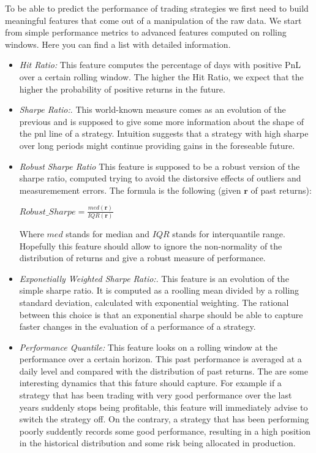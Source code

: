 \documentclass[a4paper]{article}
\numberwithin{equation}{subsection}
\begin{document}
To be able to predict the performance of trading strategies we first need to build meaningful features that come out of a manipulation of the raw data. We start from simple performance metrics to advanced features computed on rolling windows. Here you can find a list with detailed information.

\begin{itemize} 
	\item \textit{Hit Ratio:} This feature computes the percentage of days with positive PnL over a certain rolling window. The higher the Hit Ratio, we expect that the higher the probability of positive returns in the future.\\ 
	
	\item \textit{Sharpe Ratio:}. This world-known measure comes as an evolution of the previous and is supposed to give some more information about the shape of the pnl line of a strategy. Intuition suggests that a strategy with high sharpe over long periods might continue providing gains in the foreseable future.\\
	
	\item \textit{Robust Sharpe Ratio} This feature is supposed to be a robust version of the sharpe ratio, computed trying to avoid the distorsive effects of outliers and measuremement errors. The formula is the following (given $\mathbf{r}$ of past returns):
	
		\begin{center} 
			$\displaystyle Robust\_Sharpe =  \frac{med(\mathbf{r})}{IQR(\mathbf{r})}$
		\end{center}
		
	Where $med$ stands for median and $IQR$ stands for interquantile range. Hopefully this feature should allow to ignore the non-normality of the distribution of returns and give a robust measure of performance.\\
	
	\item \textit{Exponetially Weighted Sharpe Ratio:}. This feature is an evolution of the simple sharpe ratio. It is computed as a roolling mean divided by a rolling standard deviation, calculated with exponential weighting. The rational between this choice is that an exponential sharpe should be able to capture faster changes in the evaluation of a performance of a strategy.\\
	
	  
	\item \textit{Performance Quantile:} This feature looks on a rolling window at the performance over a certain horizon. This past performance is averaged at a daily level and compared with the distribution of past returns. The are some interesting dynamics that this fature should capture. For example if a strategy that has been trading with very good performance over the last years suddenly stops being profitable, this feature will immediately advise to switch the strategy off. On the contrary, a strategy that has been performing poorly suddently records some good performance, resulting in a high position in the historical distribution and some risk being allocated in production.\\   


\end{itemize}
\end{document}
